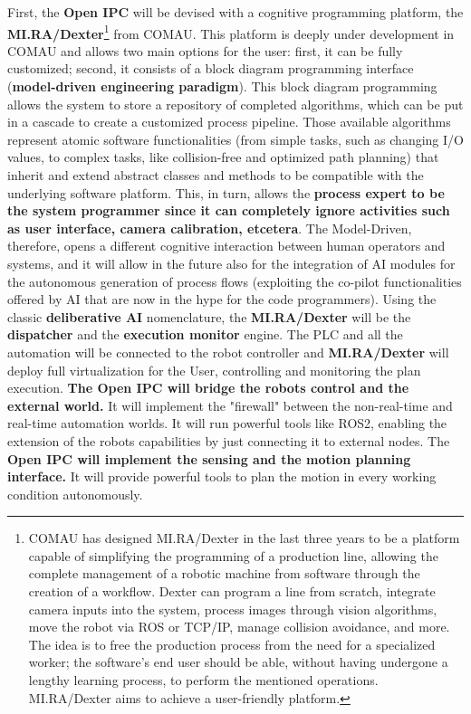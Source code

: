 First, the \textbf{Open IPC} will be devised with a cognitive
programming platform, the \textbf{MI.RA/Dexter}\footnote{COMAU has
  designed MI.RA/Dexter in the last three years to be a platform capable
  of simplifying the programming of a production line, allowing the
  complete management of a robotic machine from software through the
  creation of a workflow. Dexter can program a line from scratch,
  integrate camera inputs into the system, process images through vision
  algorithms, move the robot via ROS or TCP/IP, manage collision
  avoidance, and more. The idea is to free the production process from
  the need for a specialized worker; the software's end user should be
  able, without having undergone a lengthy learning process, to perform
  the mentioned operations. MI.RA/Dexter aims to achieve a user-friendly
  platform.} from COMAU. This platform is deeply under development in
COMAU and allows two main options for the user: first, it can be fully
customized; second, it consists of a block diagram programming interface
(\textbf{model-driven engineering paradigm}). This block diagram
programming allows the system to store a repository of completed
algorithms, which can be put in a cascade to create a customized process
pipeline. Those available algorithms represent atomic software
functionalities (from simple tasks, such as changing I/O values, to
complex tasks, like collision-free and optimized path planning) that
inherit and extend abstract classes and methods to be compatible with
the underlying software platform. This, in turn, allows the
\textbf{process expert to be the system programmer since it can
completely ignore activities such as user interface, camera calibration,
etcetera}. The Model-Driven, therefore, opens a different cognitive
interaction between human operators and systems, and it will allow in
the future also for the integration of AI modules for the autonomous
generation of process flows (exploiting the co-pilot functionalities
offered by AI that are now in the hype for the code programmers). Using
the classic \textbf{deliberative AI} nomenclature, the
\textbf{MI.RA/Dexter} will be the \textbf{dispatcher} and the
\textbf{execution monitor} engine. The PLC and all the automation will
be connected to the robot controller and \textbf{MI.RA/Dexter} will
deploy full virtualization for the User, controlling and monitoring the
plan execution. \textbf{The Open IPC will bridge the
robot\textquotesingle s control and the external world.} It will
implement the "firewall" between the non-real-time and real-time
automation worlds. It will run powerful tools like ROS2, enabling the
extension of the robot\textquotesingle s capabilities by just connecting
it to external nodes. The \textbf{Open IPC will implement the sensing
and the motion planning interface.} It will provide powerful tools to
plan the motion in every working condition autonomously.

